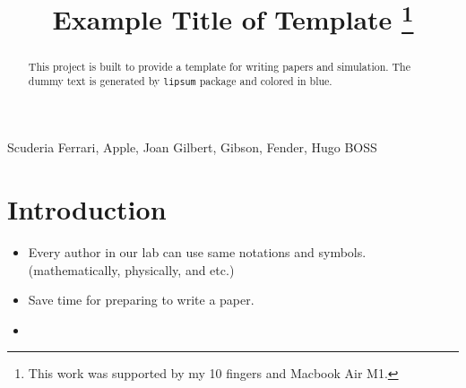 \documentclass[conference]{IEEEtran}
\begin{document}
\title{
    Example Title of Template
    \thanks{
        This work was supported by my 10 fingers and Macbook Air M1.
    }
}

\author{
\and
}

\maketitle 
\thispagestyle{empty}

\begin{abstract}
	This project is built to provide a template for writing papers and simulation.
	The dummy text is generated by \texttt{lipsum} package and colored in blue.
	\color{blue}\lipsum[1]\color{black}
\end{abstract}

\begin{IEEEkeywords}
	Scuderia Ferrari, Apple, Joan Gilbert, Gibson, Fender, Hugo BOSS
\end{IEEEkeywords}

\section{Introduction}

\begin{itemize}
    \item Every author in our lab can use same notations and symbols. (\eg mathematically, physically, and etc.)
    \item Save time for preparing to write a paper.
    \item     \cite{Lopez:2021aa}
\end{itemize}
\end{document}
